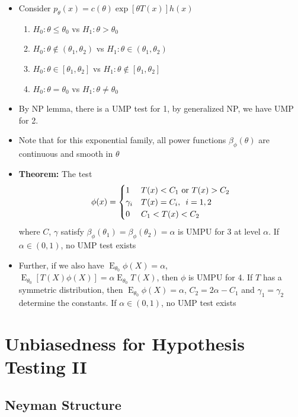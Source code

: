 \documentclass[fontsize=5pt]{scrartcl}
\DeclareMathOperator{\E}{E}
\begin{document}
\begin{multicols}{2}
\begin{itemize}
\item Consider $p_{\theta}(x) = c(\theta)\exp[\theta T(x)]h(x)$
  \begin{enumerate}
  \item $H_{0}:\theta\leq\theta_{0}$ vs $H_{1}:\theta>\theta_{0}$
  \item $H_{0}:\theta\not\in (\theta_{1}, \theta_{2})$ vs
    $H_{1}:\theta\in(\theta_{1},\theta_{2})$
  \item $H_{0}:\theta\in[\theta_{1},\theta_{2}]$ vs
    $H_{1}:\theta\not\in[\theta_{1},\theta_{2}]$
  \item $H_{0}:\theta=\theta_{0}$ vs $H_{1}:\theta\neq\theta_{0}$
  \end{enumerate}
\item By NP lemma, there is a UMP test for 1, by generalized NP, we
  have UMP for 2.
\item Note that for this exponential family, all power functions
  $\beta_{\phi}(\theta)$ are continuous and smooth in $\theta$
\item \textbf{Theorem:} The test
  \begin{equation}
    \phi(x) = \begin{cases}
      1 & T(x) < C_{1}\text{ or } T(x) > C_{2} \\
      \gamma_{i} & T(x) = C_{i},\enskip i=1,2 \\
      0 & C_{1}<T(x)<C_{2}
    \end{cases}
  \end{equation}
  where $C$, $\gamma$ satisfy $\beta_{\phi}(\theta_{1}) =
  \beta_{\phi}(\theta_{2}) = \alpha$ is UMPU for 3 at level
  $\alpha$. If $\alpha\in(0,1)$, no UMP test exists
\item Further, if we also have $\E_{\theta_{0}}\phi(X) = \alpha$,
  $\E_{\theta_{0}}[T(X)\phi(X)] = \alpha\E_{\theta_{0}}T(X)$, then
  $\phi$ is UMPU for 4. If $T$ has a symmetric distribution, then
  $\E_{\theta_{0}}\phi(X) = \alpha$, $C_{2} = 2\alpha-C_{1}$ and
  $\gamma_{1}=\gamma_{2}$ determine the constants. If
  $\alpha\in(0,1)$, no UMP test exists
\end{itemize}

\section{Unbiasedness for Hypothesis Testing II}

\subsection{Neyman Structure}


\end{multicols}
\end{document}
